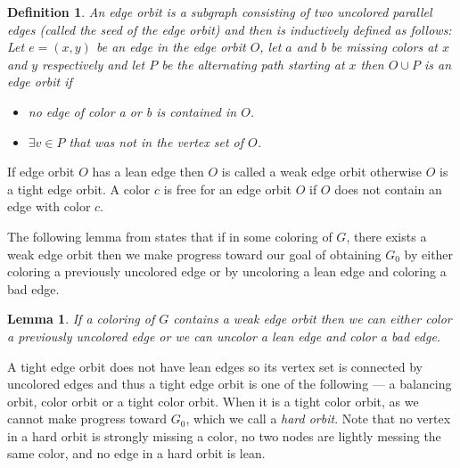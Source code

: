 \documentclass[titlepage, 11pt]{article}
\newtheorem{definition}{Definition}
\newtheorem{lemma}[theorem]{Lemma}
\begin{document}
\begin{definition}
An \emph{edge orbit} is a subgraph consisting of two uncolored parallel edges (called the \emph{seed} of the edge orbit) and then is inductively defined as follows:
Let $e = (x,y)$ be an edge in the edge orbit $O$, let $a$ and $b$ be missing colors at $x$ and $y$ respectively and let $P$ be the alternating path starting at $x$ then $O \cup P$ is an edge orbit if
\begin{itemize}
\item no edge of color a or b is contained in $O$.
\item $\exists v \in P$ that was not in the vertex set of $O$.\\
\end{itemize}
\end{definition}
If edge orbit $O$ has a lean edge then $O$ is called a weak edge orbit otherwise $O$ is a tight edge orbit. A color $c$ is free for an edge orbit $O$ if $O$ does not contain an edge with color $c$. 

The following lemma from \cite{sanders05} states that if in some coloring of $G$, there exists a weak edge orbit then we make progress toward our goal of obtaining $G_0$ by either coloring a previously uncolored edge or by uncoloring a lean edge and coloring a bad edge.
\begin{lemma}\label{lemma:weakedge}
\cite{sanders05} If a coloring of $G$ contains a weak edge orbit then we can either color a previously uncolored edge or we can uncolor a lean edge and color a bad edge.\\
\end{lemma}

A tight edge orbit does not have lean edges so its vertex set is connected 
by uncolored edges and thus a tight edge orbit is one of the following 
--- a balancing orbit, color orbit or a tight color orbit. 
When it is a tight color orbit, as we cannot make progress toward $G_0$, 
which we call a \emph{hard orbit}. 
Note that no vertex in a hard orbit is strongly missing a color, no two
nodes are lightly messing the same color, and no edge in a hard orbit is lean.
\end{document}
